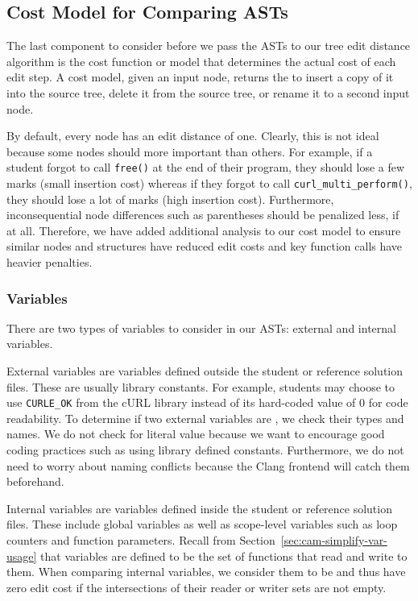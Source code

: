 \subsection{Cost Model for Comparing ASTs}
\label{sec:cam-cost-model}

The last component to consider before we pass the ASTs to our tree edit distance algorithm is the cost function or model that determines the actual cost of each edit step. A cost model, given an input node, returns the  to insert a copy of it into the source tree, delete it from the source tree, or rename it to a second input node.

By default, every node has an edit distance of one. Clearly, this is not ideal because some nodes should more important than others. For example, if a student forgot to call \texttt{free()} at the end of their program, they should lose a few marks (small insertion cost) whereas if they forgot to call \texttt{curl\_multi\_perform()}, they should lose a lot of marks (high insertion cost). Furthermore, inconsequential node differences such as parentheses should be penalized less, if at all. Therefore, we have added additional analysis to our cost model to ensure similar nodes and structures have reduced edit costs and key function calls have heavier penalties.

\subsubsection{Variables}
\label{sec:cam-ted-declref}

There are two types of variables to consider in our ASTs: external and internal variables.

External variables are variables defined outside the student or reference solution files. These are usually library constants. For example, students may choose to use \texttt{CURLE\_OK} from the cURL library instead of its hard-coded value of 0 for code readability. To determine if two external variables are , we check their types and names. We do not check for literal value because we want to encourage good coding practices such as using library defined constants. Furthermore, we do not need to worry about naming conflicts because the Clang frontend will catch them beforehand.

Internal variables are variables defined inside the student or reference solution files. These include global variables as well as scope-level variables such as loop counters and function parameters. Recall from Section~\ref{sec:cam-simplify-var-usage} that variables are defined to be the set of functions that read and write to them. When comparing internal variables, we consider them to be  and thus have zero edit cost if the intersections of their reader or writer sets are not empty.

